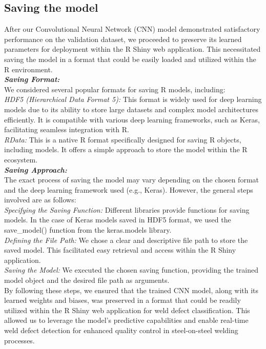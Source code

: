 \documentclass{article_saj}
\begin{document}
\subsection{Saving the model}
\indent
\indent After our Convolutional Neural Network (CNN) model demonstrated satisfactory performance on the validation dataset, we proceeded to preserve its learned parameters for deployment within the R Shiny web application. This necessitated saving the model in a format that could be easily loaded and utilized within the R environment.\\
\indent \textbf{\textit{Saving Format:}}\\
We considered several popular formats for saving R models, including:\\
    \indent \textit{HDF5 (Hierarchical Data Format 5):} This format is widely used for deep learning models due to its ability to store large datasets and complex model architectures efficiently. It is compatible with various deep learning frameworks, such as Keras, facilitating seamless integration with R.\\
    \indent \textit{RData:} This is a native R format specifically designed for saving R objects, including models. It offers a simple approach to store the model within the R ecosystem.\\

\indent \textbf{\textit{Saving Approach:}}\\
The exact process of saving the model may vary depending on the chosen format and the deep learning framework used (e.g., Keras). However, the general steps involved are as follows:\\

    \indent \textit{Specifying the Saving Function:} Different libraries provide functions for saving models. In the case of Keras models saved in HDF5 format, we used the save\_model() function from the keras.models library.\\
    \indent \textit{Defining the File Path:} We chose a clear and descriptive file path to store the saved model. This facilitated easy retrieval and access within the R Shiny application.\\
    \indent \textit{Saving the Model:} We executed the chosen saving function, providing the trained model object and the desired file path as arguments.\\

\indent By following these steps, we ensured that the trained CNN model, along with its learned weights and biases, was preserved in a format that could be readily utilized within the R Shiny web application for weld defect classification. This allowed us to leverage the model's predictive capabilities and enable real-time weld defect detection for enhanced quality control in steel-on-steel welding processes.\\
\end{document}
